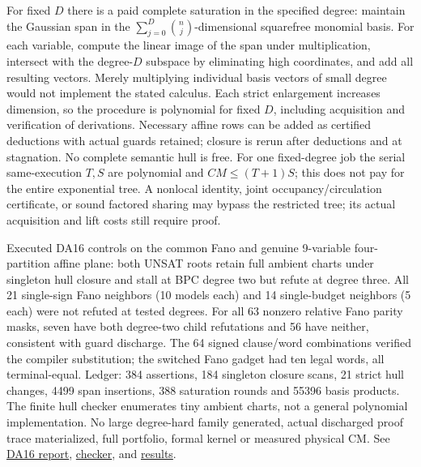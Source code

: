 \documentclass[11pt]{article}
\begin{document}
For fixed $D$ there is a paid complete saturation in the specified degree: maintain the Gaussian span in the $\sum_{j=0}^D{n\choose j}$-dimensional squarefree monomial basis. For each variable, compute the linear image of the span under multiplication, intersect with the degree-$D$ subspace by eliminating high coordinates, and add all resulting vectors. Merely multiplying individual basis vectors of small degree would not implement the stated calculus. Each strict enlargement increases dimension, so the procedure is polynomial for fixed $D$, including acquisition and verification of derivations. Necessary affine rows can be added as certified deductions with actual guards retained; closure is rerun after deductions and at stagnation. No complete semantic hull is free. For one fixed-degree job the serial same-execution $T,S$ are polynomial and $CM\le(T+1)S$; this does not pay for the entire exponential tree. A nonlocal identity, joint occupancy/circulation certificate, or sound factored sharing may bypass the restricted tree; its actual acquisition and lift costs still require proof.

Executed DA16 controls on the common Fano and genuine 9-variable four-partition affine plane: both UNSAT roots retain full ambient charts under singleton hull closure and stall at BPC degree two but refute at degree three. All 21 single-sign Fano neighbors (10 models each) and 14 single-budget neighbors (5 each) were not refuted at tested degrees. For all 63 nonzero relative Fano parity masks, seven have both degree-two child refutations and 56 have neither, consistent with guard discharge. The 64 signed clause/word combinations verified the compiler substitution; the switched Fano gadget had ten legal words, all terminal-equal. Ledger: 384 assertions, 184 singleton closure scans, 21 strict hull changes, 4499 span insertions, 388 saturation rounds and 55396 basis products. The finite hull checker enumerates tiny ambient charts, not a general polynomial implementation. No large degree-hard family generated, actual discharged proof trace materialized, full portfolio, formal kernel or measured physical CM. See \href{https://github.com/j15marti/pnp/commit/98aa613b0d885868fee92a3fe61fdc6d42b1802e}{DA16 report}, \href{https://github.com/j15marti/pnp/commit/d91f769acbfb1a9cd6a4cbbfe67573581472ea9c}{checker}, and \href{https://github.com/j15marti/pnp/commit/dfe615cff36377cb525e6cab882cd846b0bebe09}{results}.
\end{document}
